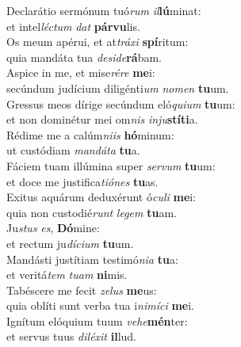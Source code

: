 \evenverse Declarátio sermónum tuó\textit{rum} \textit{il}\textbf{lú}minat:~\*\\
\evenverse et intel\textit{lé}\textit{ctum} \textit{dat} \textbf{pár}\textbf{vu}lis.\\
\oddverse Os meum apérui, et at\textit{trá}\textit{xi} \textbf{spí}ritum:~\*\\
\oddverse quia mandáta tua \textit{de}\textit{si}\textit{de}\textbf{rá}bam.\\
\evenverse Aspice in me, et mise\textit{ré}\textit{re} \textbf{me}i:~\*\\
\evenverse secúndum judícium diligénti\textit{um} \textit{no}\textit{men} \textbf{tu}um.\\
\oddverse Gressus meos dírige secúndum eló\textit{qui}\textit{um} \textbf{tu}um:~\*\\
\oddverse et non dominétur mei om\textit{nis} \textit{in}\textit{ju}\textbf{stí}\textbf{ti}a.\\
\evenverse Rédime me a calúm\textit{ni}\textit{is} \textbf{hó}minum:~\*\\
\evenverse ut custódiam \textit{man}\textit{dá}\textit{ta} \textbf{tu}a.\\
\oddverse Fáciem tuam illúmina super \textit{ser}\textit{vum} \textbf{tu}um:~\*\\
\oddverse et doce me justifica\textit{ti}\textit{ó}\textit{nes} \textbf{tu}as.\\
\evenverse Exitus aquárum deduxérunt ó\textit{cu}\textit{li} \textbf{me}i:~\*\\
\evenverse quia non custodié\textit{runt} \textit{le}\textit{gem} \textbf{tu}am.\\
\oddverse Ju\textit{stus} \textit{es}, \textbf{Dó}mine:~\*\\
\oddverse et rectum ju\textit{dí}\textit{ci}\textit{um} \textbf{tu}um.\\
\evenverse Mandásti justítiam testimó\textit{ni}\textit{a} \textbf{tu}a:~\*\\
\evenverse et veritá\textit{tem} \textit{tu}\textit{am} \textbf{ni}mis.\\
\oddverse Tabéscere me fecit \textit{ze}\textit{lus} \textbf{me}us:~\*\\
\oddverse quia oblíti sunt verba tua i\textit{ni}\textit{mí}\textit{ci} \textbf{me}i.\\
\evenverse Ignítum elóquium tuum \textit{ve}\textit{he}\textbf{mén}ter:~\*\\
\evenverse et servus tuus \textit{di}\textit{lé}\textit{xit} \textbf{il}lud.\\
